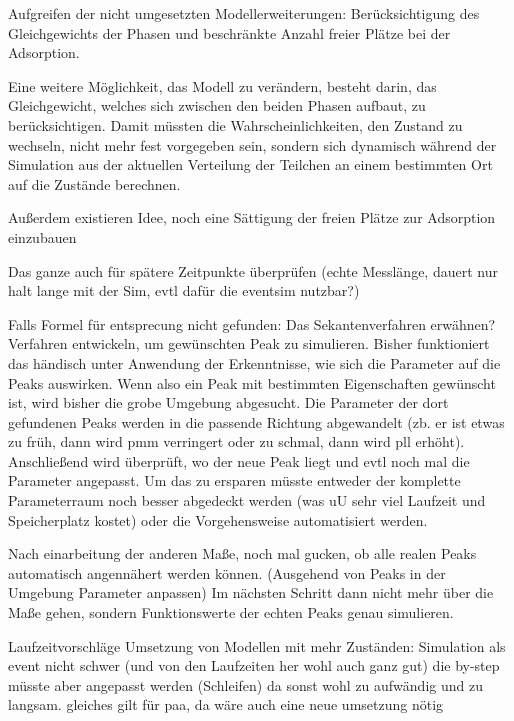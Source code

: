 Aufgreifen der nicht umgesetzten Modellerweiterungen: Berücksichtigung des Gleichgewichts der Phasen und beschränkte Anzahl freier Plätze bei der Adsorption.

Eine weitere Möglichkeit, das Modell zu verändern, besteht darin, das Gleichgewicht, welches sich zwischen den beiden Phasen aufbaut, zu berücksichtigen. Damit müssten die Wahrscheinlichkeiten, den Zustand zu wechseln, nicht mehr fest vorgegeben sein, sondern sich dynamisch während der Simulation aus der aktuellen Verteilung der Teilchen an einem bestimmten Ort auf die Zustände berechnen.

Außerdem existieren Idee, noch eine Sättigung der freien Plätze zur Adsorption einzubauen

Das ganze auch für spätere Zeitpunkte überprüfen (echte Messlänge, dauert nur halt lange mit der Sim, evtl dafür die eventsim nutzbar?)

Falls Formel für entsprecung nicht gefunden: Das Sekantenverfahren erwähnen?
Verfahren entwickeln, um gewünschten Peak zu simulieren. Bisher funktioniert das händisch unter Anwendung der Erkenntnisse, wie sich die Parameter auf die Peaks auswirken. Wenn also ein Peak mit bestimmten Eigenschaften gewünscht ist, wird bisher die grobe Umgebung abgesucht. Die Parameter der dort gefundenen Peaks werden in die passende Richtung abgewandelt (zb. er ist etwas zu früh, dann wird pmm verringert oder zu schmal, dann wird pll erhöht). Anschließend wird überprüft, wo der neue Peak liegt und evtl noch mal die Parameter angepasst. 
Um das zu ersparen müsste entweder der komplette Parameterraum noch besser abgedeckt werden (was uU sehr viel Laufzeit und Speicherplatz kostet) oder die Vorgehensweise automatisiert werden.

Nach einarbeitung der anderen Maße, noch mal gucken, ob alle realen Peaks automatisch angennähert werden können. (Ausgehend von Peaks in der Umgebung Parameter anpassen)
Im nächsten Schritt dann nicht mehr über die Maße gehen, sondern Funktionswerte der echten Peaks genau simulieren.

Laufzeitvorschläge
Umsetzung von Modellen mit mehr Zuständen: Simulation als event nicht schwer (und von den Laufzeiten her wohl auch ganz gut) die by-step müsste aber angepasst werden (Schleifen) da sonst wohl zu aufwändig und zu langsam. gleiches gilt für paa, da wäre auch eine neue umsetzung nötig
